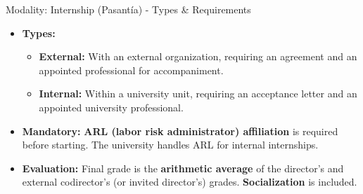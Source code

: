         \begin{frame}{Modality: Internship (Pasantía) - Types \& Requirements}
          \begin{itemize}
            \item<1-> \textbf{Types:}
              \begin{itemize}
                \item<2-> \textbf{External:} With an external organization, requiring an agreement and an appointed professional for accompaniment.
                \item<3-> \textbf{Internal:} Within a university unit, requiring an acceptance letter and an appointed university professional.
              \end{itemize}
            \item<4-> \textbf{Mandatory:} \textbf{ARL (labor risk administrator) affiliation} is required before starting. The university handles ARL for internal internships.
            \item<5-> \textbf{Evaluation:} Final grade is the \textbf{arithmetic average} of the director's and external codirector's (or invited director's) grades. \textbf{Socialization} is included.
          \end{itemize}
        \end{frame}


